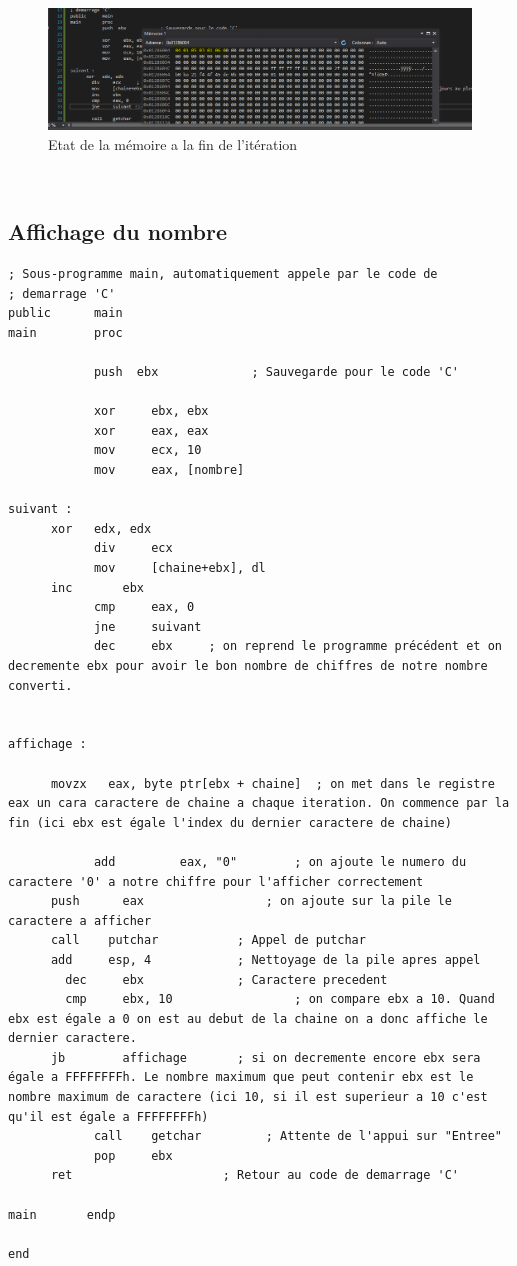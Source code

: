 \documentclass[11pt]{report}
\begin{document}
\begin{figure}[ht]
\includegraphics[width=12cm]{Capture10.PNG}
\caption{Etat de la mémoire a la fin de l'itération}
\end{figure}
\\
\subsection{Affichage du nombre}

\begin{lstlisting}
; Sous-programme main, automatiquement appele par le code de
; demarrage 'C'
public      main
main        proc

			push  ebx             ; Sauvegarde pour le code 'C'

			xor		ebx, ebx
			xor		eax, eax
			mov		ecx, 10
			mov		eax, [nombre]

suivant :
      xor 	edx, edx
			div	    ecx
			mov		[chaine+ebx], dl
      inc		ebx
			cmp		eax, 0
			jne		suivant
			dec		ebx     ; on reprend le programme précédent et on decremente ebx pour avoir le bon nombre de chiffres de notre nombre converti.


affichage :

      movzx   eax, byte ptr[ebx + chaine]  ; on met dans le registre eax un cara caractere de chaine a chaque iteration. On commence par la fin (ici ebx est égale l'index du dernier caractere de chaine)

			add			eax, "0"        ; on ajoute le numero du caractere '0' a notre chiffre pour l'afficher correctement
      push   	eax         		; on ajoute sur la pile le caractere a afficher
      call    putchar     		; Appel de putchar
      add     esp, 4      		; Nettoyage de la pile apres appel
  		dec     ebx             ; Caractere precedent
	    cmp     ebx, 10 				; on compare ebx a 10. Quand ebx est égale a 0 on est au debut de la chaine on a donc affiche le dernier caractere.
      jb     	affichage       ; si on decremente encore ebx sera égale a FFFFFFFFh. Le nombre maximum que peut contenir ebx est le nombre maximum de caractere (ici 10, si il est superieur a 10 c'est qu'il est égale a FFFFFFFFh)
			call    getchar         ; Attente de l'appui sur "Entree"
			pop     ebx
      ret                     ; Retour au code de demarrage 'C'

main       endp

end




\end{lstlisting}
\end{document}
